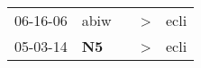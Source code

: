 \begin{supertabular}{p{0.07\textwidth}p{0.06\textwidth}p{0.02\textwidth}p{0.02\textwidth}p{0.06\textwidth}}
 06-16-06\textsuperscript{} &         abiw\textsuperscript{} &   &  \textgreater &  ecli\textsuperscript{} \\
 05-03-14\textsuperscript{} &  \textbf{N5\textsuperscript{}} &   &  \textgreater &  ecli\textsuperscript{} \\
\end{supertabular}

